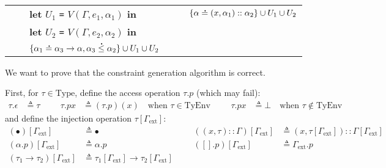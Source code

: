 \documentclass{article}
\theoremstyle{definition}
\newcommand*{\cons}{::}
\newcommand*{\A}[1]{\overset{\,_{\mbox{\Large .}}}{#1}}
\newcommand*{\TyEnv}{\text{TyEnv}}
\newcommand*{\Type}{\text{Type}}
\newcommand*{\external}{\Gamma_{\text{ext}}}
\begin{document}
\begin{tabular}{rclrcl}
                                 &              & \textbf{let} $U_1$ \texttt{=} $V(\Gamma,e_1,\alpha_1)$ \textbf{in}                   &                                            &              & $\{\alpha\A{=}(x,\alpha_1)\cons\alpha_2\}\cup U_1\cup U_2$                          \\
                                 &              & \textbf{let} $U_2$ \texttt{=} $V(\Gamma,e_2,\alpha_2)$ \textbf{in}                                                                                                                                                                     \\
                                 &              & $\{\alpha_1\A{=}\alpha_3\rightarrow\alpha,\alpha_3\A{\le}\alpha_2\}\cup U_1\cup U_2$
\end{tabular}

\vphantom{}

We want to prove that the constraint generation algorithm is correct.

First, for $\tau\in\Type$, define the access operation $\tau.p$ (which may fail):
\begin{align*}
  \tau.\epsilon & \triangleq\tau &  &  & \tau.px & \triangleq(\tau.p)(x)\quad\text{when }\tau\in\TyEnv &  &  & \tau.px & \triangleq\bot\quad\text{when }\tau\not\in\TyEnv
\end{align*}
and define the injection operation $\tau[\external]$:
\begin{align*}
  (\bullet)[\external]                 & \triangleq\bullet                                       &  &  & ((x,\tau)\cons\Gamma)[\external] & \triangleq(x,\tau[\external])\cons\Gamma[\external] \\
  (\alpha.p)[\external]                & \triangleq\alpha.p                                      &  &  & ([].p)[\external]                & \triangleq\external.p                               \\
  (\tau_1\rightarrow\tau_2)[\external] & \triangleq\tau_1[\external]\rightarrow\tau_2[\external]
\end{align*}
\end{document}
